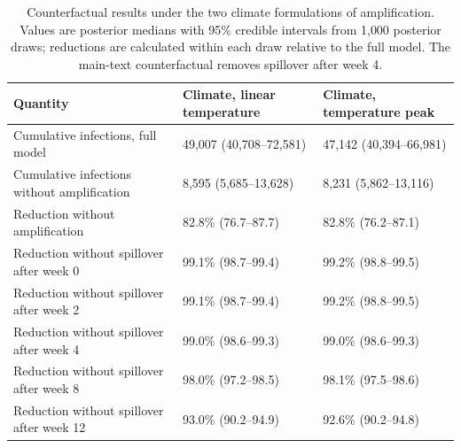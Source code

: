 \begin{table}[ht]
\centering
\small
\caption{Counterfactual results under the two climate formulations of amplification. Values are posterior medians with 95\% credible intervals from 1{,}000 posterior draws; reductions are calculated within each draw relative to the full model. The main-text counterfactual removes spillover after week 4.}
\label{tab:si_counterfactual_climate_models}
\begin{tabular}{lll}
\toprule
Quantity & Climate, linear temperature & Climate, temperature peak \\
\midrule
Cumulative infections, full model & 49,007 (40,708--72,581) & 47,142 (40,394--66,981) \\
Cumulative infections without amplification & 8,595 (5,685--13,628) & 8,231 (5,862--13,116) \\
Reduction without amplification & 82.8\% (76.7--87.7) & 82.8\% (76.2--87.1) \\
Reduction without spillover after week 0 & 99.1\% (98.7--99.4) & 99.2\% (98.8--99.5) \\
Reduction without spillover after week 2 & 99.1\% (98.7--99.4) & 99.2\% (98.8--99.5) \\
Reduction without spillover after week 4 & 99.0\% (98.6--99.3) & 99.0\% (98.6--99.3) \\
Reduction without spillover after week 8 & 98.0\% (97.2--98.5) & 98.1\% (97.5--98.6) \\
Reduction without spillover after week 12 & 93.0\% (90.2--94.9) & 92.6\% (90.2--94.8) \\
\bottomrule
\end{tabular}
\end{table}
